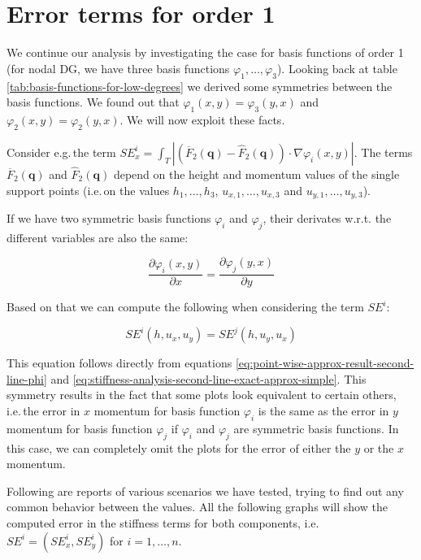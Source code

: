 \documentclass[a4paper, twoside]{article}
\newcommand{\pd}[2]{\dfrac{\partial #1}{\partial #2}}
\renewcommand{\phi}{\varphi}
\begin{document}
\section{Error terms for order 1}
\label{sec:stiffness-analysis-first-touch}

We continue our analysis by investigating the case for basis functions of order 1 (for nodal DG, we have three basis functions $\phi_1,\dots,\phi_3$). Looking back at table \ref{tab:basis-functions-for-low-degrees} we derived some symmetries between the basis functions. We found out that $\phi_1(x,y)=\phi_3(y,x)$ and $\phi_2(x,y)=\phi_2(y,x)$. We will now exploit these facts.

Consider e.g.\,the term $SE_x^i = \int_T \left| \left(\overline{F}_2(\mathbf{q})-\widehat{F}_2(\mathbf{q})\right) \cdot \nabla\phi_i(x,y) \right|$. The terms $\overline{F}_2(\mathbf{q})$ and $\widehat{F}_2(\mathbf{q})$ depend on the height and momentum values of the single support points (i.e.\,on the values $h_1,\dots,h_3$, $u_{x,1},\dots,u_{x,3}$ and $u_{y,1},\dots,u_{y,3}$).

If we have two symmetric basis functions $\phi_i$ and $\phi_j$, their derivates w.r.t. the different variables are also the same:

\begin{equation*}
  \pd{\phi_i(x,y)}{x} = \pd{\phi_j(y,x)}{y}
\end{equation*}

Based on that we can compute the following when considering the term $SE^i$:

\begin{equation*}
  SE^i(h, u_x, u_y) = SE^j(h, u_y, u_x)
\end{equation*}

This equation follows directly from equations \eqref{eq:point-wise-approx-result-second-line-phi} and \eqref{eq:stiffness-analysis-second-line-exact-approx-simple}.
This symmetry results in the fact that some plots look equivalent to certain others, i.e.\,the error in $x$ momentum for basis function $\phi_i$ is the same as the error in $y$ momentum for basis function $\phi_j$ if $\phi_i$ and $\phi_j$ are symmetric basis functions.
In this case, we can completely omit the plots for the error of either the $y$ or the $x$ momentum.

Following are reports of various scenarios we have tested, trying to find out any common behavior between the values. All the following graphs will show the computed error in the stiffness terms for both components, i.e.\,$SE^i = \left(SE_x^i, SE_y^i\right)$ for $i=1,\dots, n$.
\end{document}
